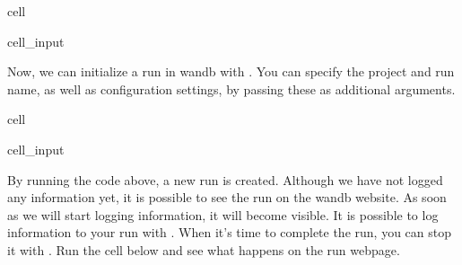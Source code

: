 \documentclass[letterpaper,10pt,english]{jupyterBook}
\begin{document}
\begin{sphinxuseclass}{cell}\begin{sphinxVerbatimInput}

\begin{sphinxuseclass}{cell_input}
\begin{sphinxVerbatim}[commandchars=\\\{\}]
 
\end{sphinxVerbatim}

\end{sphinxuseclass}\end{sphinxVerbatimInput}

\end{sphinxuseclass}
\sphinxAtStartPar
Now, we can initialize a run in wandb with . You can specify the project and run name, as well as configuration settings, by passing these as additional arguments.

\begin{sphinxuseclass}{cell}\begin{sphinxVerbatimInput}

\begin{sphinxuseclass}{cell_input}
\begin{sphinxVerbatim}[commandchars=\\\{\}]
     
\end{sphinxVerbatim}

\end{sphinxuseclass}\end{sphinxVerbatimInput}

\end{sphinxuseclass}
\sphinxAtStartPar
By running the code above, a new run is created. Although we have not logged any information yet, it is possible to see the run on the wandb website. As soon as we will start logging information, it will become visible. It is possible to log information to your run with . When it’s time to complete the run, you can stop it with . Run the cell below and see what happens on the run webpage.
\end{document}
